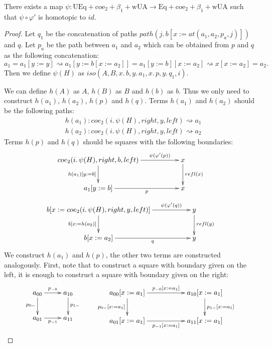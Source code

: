 \documentclass[reqno]{amsart}
\theoremstyle{definition}
\theoremstyle{remark}
\newcommand{\repl}{:=}
\newcommand{\idtype}{\rightsquigarrow}
\newcommand{\wUA}{\mathrm{wUA}}
\newcommand{\coe}{\mathrm{coe}}
\newcommand{\Eq}{\mathrm{Eq}}
\newcommand{\UEq}{\mathrm{UEq}}
\numberwithin{figure}{section}
\begin{document}
\begin{lem}[UA]
There exists a map $\psi : \UEq + \coe_2 + \beta_1 + \wUA \to \Eq + \coe_2 + \beta_1 + \wUA$ such that $\psi \circ \varphi'$ is homotopic to $id$.
\end{lem}
\begin{proof}
Let $q_1$ be the concatenation of paths $path(j.\,b[x \repl at(a_1, a_2, p_a,j)])$ and $q$.
Let $p_a$ be the path between $a_1$ and $a_2$ which can be obtained from $p$ and $q$ as the following concatenation:
\[ a_1 = a_1[y \repl y] \idtype a_1[y \repl b[x \repl a_2]] = a_1[y \repl b][x \repl a_2] \idtype x[x \repl a_2] = a_2. \]
Then we define $\psi(H)$ as $iso(A, B, x.\,b, y.\,a_1, x.\,p, y.\,q_1, i)$.

We can define $h(A)$ as $A$, $h(B)$ as $B$ and $h(b)$ as $b$.
Thus we only need to construct $h(a_1)$, $h(a_2)$, $h(p)$ and $h(q)$.
Terms $h(a_1)$ and $h(a_2)$ should be the following paths:
\begin{align*}
& h(a_1) : coe_2(i.\,\psi(H), right, y, left) \idtype a_1 \\
& h(a_2) : coe_2(i.\,\psi(H), right, y, left) \idtype a_2
\end{align*}
Terms $h(p)$ and $h(q)$ should be squares with the following boundaries:
\[ \xymatrix{ coe_2(i.\,\psi(H), right, b, left) \ar[rr]^-{\psi(\varphi'(p))} \ar[d]_{h(a_1)[y \repl b]} & & x \ar[d]^{refl(x)} \\
              a_1[y \repl b] \ar[rr]_-p                                                                          & & x
            } \]
\[ \xymatrix{ b[x \repl coe_2(i.\,\psi(H), right, y, left)] \ar[rr]^-{\psi(\varphi'(q))} \ar[d]_{b[x \repl h(a_2)]} & & y \ar[d]^{refl(y)} \\
              b[x \repl a_2] \ar[rr]_-q                                                                                     & & y
            } \]
We construct $h(a_1)$ and $h(p)$, the other two terms are constructed analogously.
First, note that to construct a square with boundary given on the left, it is enough to construct a square with boundary given on the right:
\[ \xymatrix{ a_{00} \ar[r]^{p_{-0}} \ar[d]_{p_{0-}} & a_{10} \ar[d]^{p_{1-}} \\
              a_{01} \ar[r]_{p_{-1}}                 & a_{11}
            }
\qquad
   \xymatrix{ a_{00}[x \repl a_1] \ar[rr]^{p_{-0}[x \repl a_1]} \ar[d]_{p_{0-}[x \repl a_1]} & & a_{10}[x \repl a_1] \ar[d]^{p_{1-}[x \repl a_1]} \\
              a_{01}[x \repl a_1] \ar[rr]_{p_{-1}[x \repl a_1]}                              & & a_{11}[x \repl a_1]
}\]
\end{proof}
\end{document}
